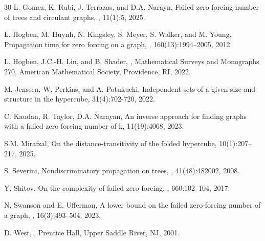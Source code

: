 \documentclass[twoside, 12pt]{article}
\theoremstyle{definition}
\begin{document}
\begin{thebibliography}{30}
{\sc L. Gomez, K. Rubi, J. Terrazas, and D.A. Narayn},
\newblock Failed zero forcing number of trees and circulant graphs,
, 11(1):5, 2025.

{\sc L. Hogben, M. Huynh, N. Kingsley, S. Meyer, S. Walker, and M. Young},
\newblock Propagation time for zero forcing on a graph,
, 160(13):1994--2005, 2012.

{\sc L. Hogben, J.C.-H. Lin, and B. Shader},
,
\newblock Mathematical Surveys and Monographs 270, American Mathematical Society, Providence, RI, 2022.

{\sc M. Jenssen, W. Perkins, and A. Potukuchi},
\newblock Independent sets of a given size and structure in the hypercube,
 31(4):702-720, 2022.

{\sc C. Kaudan, R. Taylor, D.A. Narayan},
\newblock An inverse approach for finding graphs with a failed zero forcing number of k,
 11(19):4068, 2023.

{\sc S.M. Mirafzal},
\newblock On the distance-transitivity of the folded hypercube,
 10(1):207--217, 2025. 

{\sc S. Severini},
\newblock Nondiscriminatory propagation on trees,
, 41(48):482002, 2008.

{\sc Y. Shitov},
\newblock On the complexity of failed zero forcing,
, 660:102--104, 2017. 

{\sc N. Swanson and E. Ufferman},
\newblock A lower bound on the failed zero-forcing number of a graph,
, 16(3):493--504, 2023. 

{\sc D. West},
,
\newblock Prentice Hall, Upper Saddle River, NJ, 2001.
\end{thebibliography}
\end{document}
